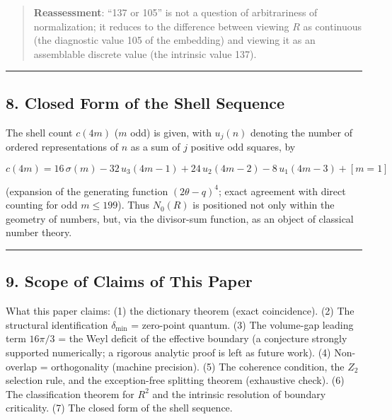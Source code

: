 \documentclass[
]{article}
\begin{document}
\begin{quote}
\textbf{Reassessment}: ``137 or 105'' is not a question of arbitrariness
of normalization; it reduces to the difference between viewing \(R\) as
continuous (the diagnostic value 105 of the embedding) and viewing it as
an assemblable discrete value (the intrinsic value 137).
\end{quote}

\begin{center}\rule{0.5\linewidth}{0.5pt}\end{center}

\subsection{8. Closed Form of the Shell
Sequence}\label{closed-form-of-the-shell-sequence}

The shell count \(c(4m)\) (\(m\) odd) is given, with \(u_j(n)\) denoting
the number of ordered representations of \(n\) as a sum of \(j\)
positive odd squares, by

\[
c(4m) = 16\,\sigma(m) - 32\,u_3(4m-1) + 24\,u_2(4m-2) - 8\,u_1(4m-3) + [m{=}1]
\]

(expansion of the generating function \((2\theta-q)^4\); exact agreement
with direct counting for odd \(m\le199\)). Thus \(N_0(R)\) is positioned
not only within the geometry of numbers, but, via the divisor-sum
function, as an object of classical number theory.

\begin{center}\rule{0.5\linewidth}{0.5pt}\end{center}

\subsection{9. Scope of Claims of This
Paper}\label{scope-of-claims-of-this-paper}

What this paper claims: (1) the dictionary theorem (exact coincidence).
(2) The structural identification \(\delta_{\min}\) = zero-point
quantum. (3) The volume-gap leading term \(16\pi/3\) = the Weyl deficit
of the effective boundary (a conjecture strongly supported numerically;
a rigorous analytic proof is left as future work). (4) Non-overlap =
orthogonality (machine precision). (5) The coherence condition, the
\(Z_2\) selection rule, and the exception-free splitting theorem
(exhaustive check). (6) The classification theorem for \(R^2\) and the
intrinsic resolution of boundary criticality. (7) The closed form of the
shell sequence.
\end{document}
